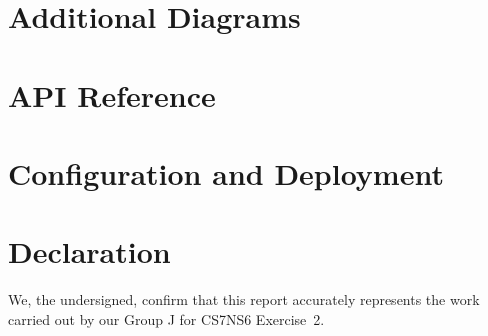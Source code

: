 \documentclass[12pt,a4paper]{article}
\begin{document}
\newpage


\newpage
\appendix

\section{Additional Diagrams}

\section{API Reference}
\label{app:api}

\section{Configuration and Deployment}

\newpage
\section*{Declaration}
We, the undersigned, confirm that this report accurately represents the work carried out by our Group J for CS7NS6 Exercise~2.

\vspace{1.5cm}
\end{document}
